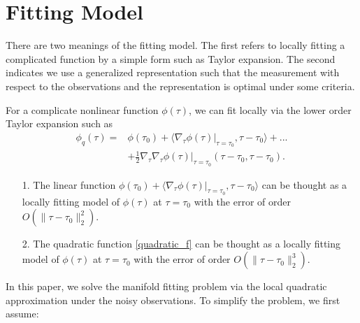 \documentclass{article}
\newtheorem{assumption}[theorem]{Assumption}
\theoremstyle{remark}
\begin{document}
\section{Fitting Model}
There are two meanings of the fitting model. The first refers to locally fitting a complicated function by a simple form such as Taylor expansion. The second indicates we use a generalized representation such that the measurement with respect to the observations and the representation is optimal under some criteria.  

For a complicate nonlinear function $\phi(\tau)$, we can fit locally via the lower order Taylor expansion such as
\begin{equation}\label{quadratic_f}
\begin{aligned}
\phi_q(\tau) = &\phi(\tau_0) + \langle \nabla_\tau \phi(\tau)|_{\tau=\tau_0}, \tau-\tau_0 \rangle +...\\
&+ \frac{1}{2} \nabla_\tau \nabla_\tau \phi(\tau)|_{\tau=\tau_0} (\tau-\tau_0,\tau-\tau_0).
\end{aligned}
\end{equation}
\begin{itemize}
\item[1.] The linear function
$
\phi(\tau_0) + \langle \nabla_\tau \phi(\tau)|_{\tau=\tau_0}, \tau-\tau_0 \rangle
$ 
can be thought as a locally fitting model of $\phi(\tau)$ at $\tau=\tau_0$ with the error of order $O(\|\tau-\tau_0 \|_2^2)$.
\item[2.] The quadratic function \eqref{quadratic_f} can be thought as a locally fitting model of $\phi(\tau)$ at $\tau=\tau_0$ with the error of order $O(\|\tau-\tau_0 \|_2^3)$.
\end{itemize}
In this paper, we solve the manifold fitting problem via the local quadratic approximation under the noisy observations. To simplify the problem, we first assume:
\end{document}
